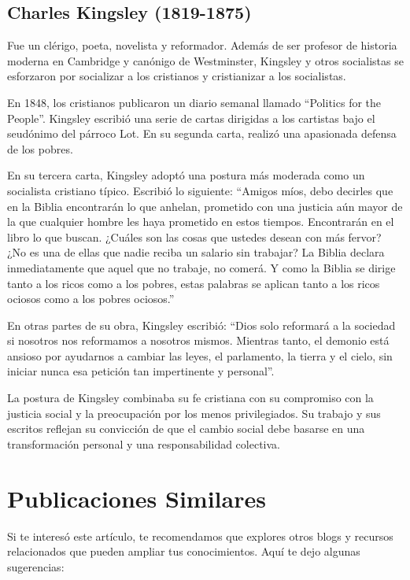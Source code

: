 \documentclass[
  jou,
  floatsintext,
  longtable,
  a4paper,
  nolmodern,
  notxfonts,
  notimes,
  colorlinks=true,linkcolor=blue,citecolor=blue,urlcolor=blue]{apa7}
\begin{document}
\subsection{Charles Kingsley
(1819-1875)}\label{charles-kingsley-1819-1875}

Fue un clérigo, poeta, novelista y reformador. Además de ser profesor de
historia moderna en Cambridge y canónigo de Westminster, Kingsley y
otros socialistas se esforzaron por socializar a los cristianos y
cristianizar a los socialistas.

En 1848, los cristianos publicaron un diario semanal llamado ``Politics
for the People''. Kingsley escribió una serie de cartas dirigidas a los
cartistas bajo el seudónimo del párroco Lot. En su segunda carta,
realizó una apasionada defensa de los pobres.

En su tercera carta, Kingsley adoptó una postura más moderada como un
socialista cristiano típico. Escribió lo siguiente: ``Amigos míos, debo
decirles que en la Biblia encontrarán lo que anhelan, prometido con una
justicia aún mayor de la que cualquier hombre les haya prometido en
estos tiempos. Encontrarán en el libro lo que buscan. ¿Cuáles son las
cosas que ustedes desean con más fervor? ¿No es una de ellas que nadie
reciba un salario sin trabajar? La Biblia declara inmediatamente que
aquel que no trabaje, no comerá. Y como la Biblia se dirige tanto a los
ricos como a los pobres, estas palabras se aplican tanto a los ricos
ociosos como a los pobres ociosos.''

En otras partes de su obra, Kingsley escribió: ``Dios solo reformará a
la sociedad si nosotros nos reformamos a nosotros mismos. Mientras
tanto, el demonio está ansioso por ayudarnos a cambiar las leyes, el
parlamento, la tierra y el cielo, sin iniciar nunca esa petición tan
impertinente y personal''.

La postura de Kingsley combinaba su fe cristiana con su compromiso con
la justicia social y la preocupación por los menos privilegiados. Su
trabajo y sus escritos reflejan su convicción de que el cambio social
debe basarse en una transformación personal y una responsabilidad
colectiva.

\section{Publicaciones Similares}\label{publicaciones-similares}

Si te interesó este artículo, te recomendamos que explores otros blogs y
recursos relacionados que pueden ampliar tus conocimientos. Aquí te dejo
algunas sugerencias:
\end{document}

